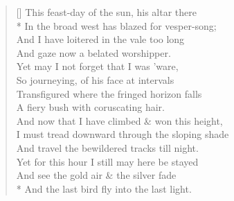 \documentclass[MAIN]{subfiles}
\begin{document}
\settowidth{\versewidth}{This feast-day of the sun, his altar there}
\begin{verse}[\versewidth]
This feast-day of the sun, his altar there\\*
\vin In the broad west has blazed for vesper-song;\\
\vin And I have loitered in the vale too long\\
And gaze now a belated worshipper.\\
Yet may I not forget that I was 'ware,\\
\vin So journeying, of his face at intervals\\
\vin Transfigured where the fringed horizon falls\\
A fiery bush with coruscating hair.\\
And now that I have climbed \& won this height,\\
\vin I must tread downward through the sloping shade\\
And travel the bewildered tracks till night.\\
\vin Yet for this hour I still may here be stayed\\
\vin And see the gold air \& the silver fade\\* 
And the last bird fly into the last light.
\end{verse}
\end{document}
